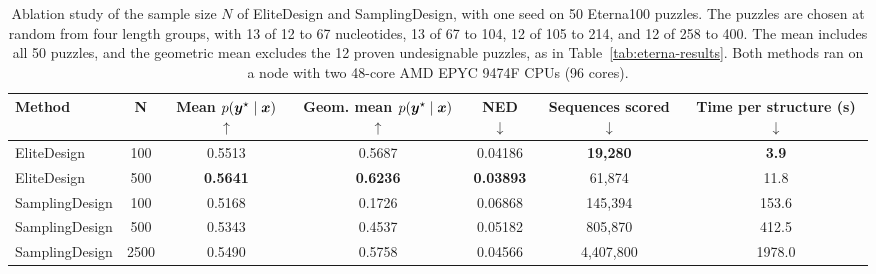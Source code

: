 \begin{table}[H]
\centering\small
\renewcommand{\arraystretch}{1.05}
\begin{tabular*}{\textwidth}{@{\extracolsep{\fill}}lcccccc@{}}
\toprule
\textbf{Method}
& \textbf{N}
& \shortstack{\textbf{Mean}\\\boldmath$p(\boldsymbol{{y}}^\star\mid\boldsymbol{{x}})$ $\uparrow$}
& \shortstack{\textbf{Geom. mean}\\\boldmath$p(\boldsymbol{{y}}^\star\mid\boldsymbol{{x}})$ $\uparrow$}
& \shortstack{\textbf{NED}\\$\downarrow$}
& \shortstack{\textbf{Sequences}\\\textbf{scored} $\downarrow$}
& \shortstack{\textbf{Time per}\\\textbf{structure (s)} $\downarrow$} \\
\midrule
EliteDesign & 100 & 0.5513 & 0.5687 & 0.04186 & \textbf{19{,}280} & \textbf{3.9} \\
EliteDesign & 500 & \textbf{0.5641} & \textbf{0.6236} & \textbf{0.03893} & 61{,}874 & 11.8 \\
\midrule
SamplingDesign & 100 & 0.5168 & 0.1726 & 0.06868 & 145{,}394 & 153.6 \\
SamplingDesign & 500 & 0.5343 & 0.4537 & 0.05182 & 805{,}870 & 412.5 \\
SamplingDesign & 2500 & 0.5490 & 0.5758 & 0.04566 & 4{,}407{,}800 & 1978.0 \\
\bottomrule
\end{tabular*}
\caption{Ablation study of the sample size $N$ of EliteDesign and SamplingDesign, with one seed on 50 Eterna100 puzzles. The puzzles are chosen at random from four length groups, with 13 of 12 to 67 nucleotides, 13 of 67 to 104, 12 of 105 to 214, and 12 of 258 to 400. The mean includes all 50 puzzles, and the geometric mean excludes the 12 proven undesignable puzzles, as in Table~\ref{tab:eterna-results}. Both methods ran on a node with two 48-core AMD EPYC 9474F CPUs (96 cores).}
\label{tab:supp-sample-size}
\end{table}
